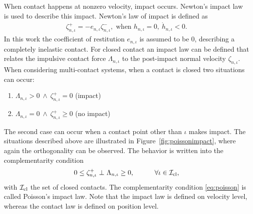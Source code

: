 \documentclass[../DC2017114Bouma.tex]{subfiles}
\begin{document}
When contact happens at nonzero velocity, impact occurs. Newton's impact law is used to describe this impact. Newton's law of impact is defined as
\begin{align}
\zeta^+_{n,\iota} = -e_{n,\iota}\zeta^-_{n,\iota},\text{ when }h_{n,\iota}=0,\ \dot{h}_{n,\iota}<0.
\end{align}
%
%
In this work the coefficient of restitution $e_{n,\iota}$ is assumed to be $0$, describing a completely inelastic contact. For closed contact an impact law can be defined that relates the impulsive contact force $\Lambda_{n,\iota}$ to the post-impact normal velocity $\zeta_{n,\iota}$. When considering multi-contact systems, when a contact is closed two situations can occur:
\begin{enumerate}
\item $\Lambda_{n,\iota} > 0\ \wedge\ \zeta^+_{n,\iota} = 0$ (impact)
\item $\Lambda_{n,\iota} = 0\ \wedge\ \zeta^+_{n,\iota} \geq 0$ (no impact)
\end{enumerate}
The second case can occur when a contact point other than $\iota$ makes impact. The situations described above are illustrated in Figure~\ref{fig:poissonimpact}, where again the orthogonality can be observed. The behavior is written into the complementarity condition
\begin{align}
0\leq \zeta^+_{n,\iota}\ \bot\ \Lambda_{n,\iota} \geq 0,\quad  \qquad \forall \iota\in\mathcal{I}_{\text{cl}},\label{eq:poisson}
\end{align}
with $\mathcal{I}_{\text{cl}}$ the set of closed contacts. The complementarity condition \eqref{eq:poisson} is called Poisson's impact law. Note that the impact law is defined on velocity level, whereas the contact law is defined on position level.
\end{document}
